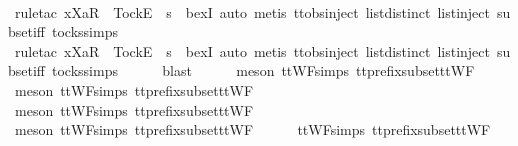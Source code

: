 \begin{isabellebody}
\ \ \ \ \isamarkupfalse%
\ {\isacharparenleft}rule{\isacharunderscore}tac\ x{\isacharequal}{\isachardoublequoteopen}{\isacharbrackleft}Xa{\isacharbrackright}\isactrlsub R\ {\isacharhash}\ {\isacharbrackleft}Tock{\isacharbrackright}\isactrlsub E\ {\isacharhash}\ s{\isacharprime}{\isachardoublequoteclose}\ \ bexI{\isacharcomma}\ auto{\isacharcomma}\ metis\ ttobs{\isachardot}inject{\isacharparenleft}{}{\isacharparenright}\ list{\isachardot}distinct{\isacharparenleft}{}{\isacharparenright}\ list{\isachardot}inject\ subset{\isacharunderscore}iff\ tocks{\isachardot}simps{\isacharparenright}\isanewline
\ \ \ \ \isamarkupfalse%
\ {\isacharparenleft}rule{\isacharunderscore}tac\ x{\isacharequal}{\isachardoublequoteopen}{\isacharbrackleft}Xa{\isacharbrackright}\isactrlsub R\ {\isacharhash}\ {\isacharbrackleft}Tock{\isacharbrackright}\isactrlsub E\ {\isacharhash}\ s{\isacharprime}{\isachardoublequoteclose}\ \ bexI{\isacharcomma}\ auto{\isacharcomma}\ metis\ ttobs{\isachardot}inject{\isacharparenleft}{}{\isacharparenright}\ list{\isachardot}distinct{\isacharparenleft}{}{\isacharparenright}\ list{\isachardot}inject\ subset{\isacharunderscore}iff\ tocks{\isachardot}simps{\isacharparenright}\isanewline
\ \ \ \ \isamarkupfalse%
\ blast\isanewline
\ \ \ \ \isamarkupfalse%
\ {\isacharparenleft}meson\ ttWF{\isachardot}simps{\isacharparenleft}{}{}{\isacharparenright}\ tt{\isacharunderscore}prefix{\isacharunderscore}subset{\isacharunderscore}ttWF{\isacharparenright}\isanewline
\ \ \ \ \isamarkupfalse%
\ {\isacharparenleft}meson\ ttWF{\isachardot}simps{\isacharparenleft}{}{}{\isacharparenright}\ tt{\isacharunderscore}prefix{\isacharunderscore}subset{\isacharunderscore}ttWF{\isacharparenright}\isanewline
\ \ \ \ \isamarkupfalse%
\ {\isacharparenleft}meson\ ttWF{\isachardot}simps{\isacharparenleft}{}{}{\isacharparenright}\ tt{\isacharunderscore}prefix{\isacharunderscore}subset{\isacharunderscore}ttWF{\isacharparenright}\isanewline
\ \ \ \ \isamarkupfalse%
\ {\isacharparenleft}meson\ ttWF{\isachardot}simps{\isacharparenleft}{}{\isacharparenright}\ tt{\isacharunderscore}prefix{\isacharunderscore}subset{\isacharunderscore}ttWF{\isacharparenright}\isanewline
\ \ \ \ \isamarkupfalse%
\ ttWF{\isachardot}simps{\isacharparenleft}{}{\isacharparenright}\ tt{\isacharunderscore}prefix{\isacharunderscore}subset{\isacharunderscore}ttWF\ \isamarkupfalse%

\end{isabellebody}
